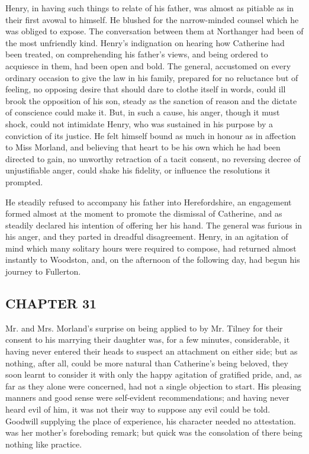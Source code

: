 Henry, in having such things to relate of his father, was almost as pitiable as in their first avowal to himself. He blushed for the narrow-minded counsel which he was obliged to expose. The conversation between them at Northanger had been of the most unfriendly kind. Henry's indignation on hearing how Catherine had been treated, on comprehending his father's views, and being ordered to acquiesce in them, had been open and bold. The general, accustomed on every ordinary occasion to give the law in his family, prepared for no reluctance but of feeling, no opposing desire that should dare to clothe itself in words, could ill brook the opposition of his son, steady as the sanction of reason and the dictate of conscience could make it. But, in such a cause, his anger, though it must shock, could not intimidate Henry, who was sustained in his purpose by a conviction of its justice. He felt himself bound as much in honour as in affection to Miss Morland, and believing that heart to be his own which he had been directed to gain, no unworthy retraction of a tacit consent, no reversing decree of unjustifiable anger, could shake his fidelity, or influence the resolutions it prompted.

He steadily refused to accompany his father into Herefordshire, an engagement formed almost at the moment to promote the dismissal of Catherine, and as steadily declared his intention of offering her his hand. The general was furious in his anger, and they parted in dreadful disagreement. Henry, in an agitation of mind which many solitary hours were required to compose, had returned almost instantly to Woodston, and, on the afternoon of the following day, had begun his journey to Fullerton.

\subsection[chapter-31]{\useURL[url33][][][]\from[url33]CHAPTER 31}

Mr. and Mrs. Morland's surprise on being applied to by Mr. Tilney for their consent to his marrying their daughter was, for a few minutes, considerable, it having never entered their heads to suspect an attachment on either side; but as nothing, after all, could be more natural than Catherine's being beloved, they soon learnt to consider it with only the happy agitation of gratified pride, and, as far as they alone were concerned, had not a single objection to start. His pleasing manners and good sense were self-evident recommendations; and having never heard evil of him, it was not their way to suppose any evil could be told. Goodwill supplying the place of experience, his character needed no attestation.  was her mother's foreboding remark; but quick was the consolation of there being nothing like practice.

